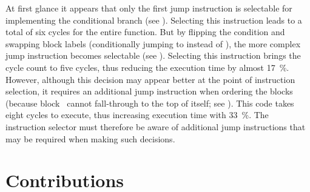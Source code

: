 At first glance it appears that only the first jump \gls{instruction} is
selectable for implementing the conditional branch (see
).
%
Selecting this \gls{instruction} leads to a total of six cycles for the entire
\gls{function}.
%
But by flipping the condition and swapping block labels (conditionally jumping
to  instead of ), the more complex jump
\gls{instruction} becomes selectable (see
).
%
Selecting this \gls{instruction} brings the cycle count to five cycles, thus
reducing the execution time by almost \SI{17}{\percent}.
%
However, although this decision may appear better at the point of
\gls{instruction selection}, it requires an additional jump \gls{instruction}
when ordering the \glspl{block} (because block~ cannot fall-through
to the top of itself; see ).
%
This code takes eight cycles to execute, thus increasing execution time with
\SI{33}{\percent}.
%
The \gls{instruction selector} must therefore be aware of additional jump
\glspl{instruction} that may be required when making such decisions.


\section{Contributions}


